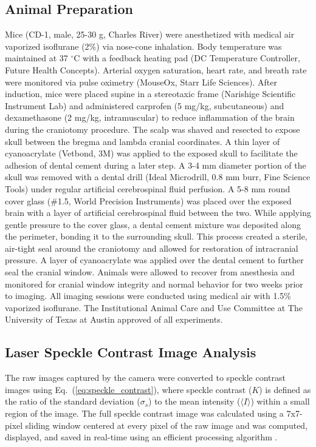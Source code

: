 \documentclass[12pt]{spieman}  %
\begin{document}
\begin{spacing}{2}
\subsection{Animal Preparation}
Mice (CD-1, male, 25-30 g, Charles River) were anesthetized with medical air vaporized isoflurane (2\%) via nose-cone inhalation. Body temperature was maintained at 37 $^\circ$C with a feedback heating pad (DC Temperature Controller, Future Health Concepts). Arterial oxygen saturation, heart rate, and breath rate were monitored via pulse oximetry (MouseOx, Starr Life Sciences). After induction, mice were placed supine in a stereotaxic frame (Narishige Scientific Instrument Lab) and administered carprofen (5 mg/kg, subcutaneous) and dexamethasone (2 mg/kg, intramuscular) to reduce inflammation of the brain during the craniotomy procedure. The scalp was shaved and resected to expose skull between the bregma and lambda cranial coordinates. A thin layer of cyanoacrylate (Vetbond, 3M) was applied to the exposed skull to facilitate the adhesion of dental cement during a later step. A 3-4 mm diameter portion of the skull was removed with a dental drill (Ideal Microdrill, 0.8 mm burr, Fine Science Tools) under regular artificial cerebrospinal fluid perfusion. A 5-8 mm round cover glass (\#1.5, World Precision Instruments) was placed over the exposed brain with a layer of artificial cerebrospinal fluid between the two. While applying gentle pressure to the cover glass, a dental cement mixture was deposited along the perimeter, bonding it to the surrounding skull. This process created a sterile, air-tight seal around the craniotomy and allowed for restoration of intracranial pressure. A layer of cyanoacrylate was applied over the dental cement to further seal the cranial window. Animals were allowed to recover from anesthesia and monitored for cranial window integrity and normal behavior for two weeks prior to imaging. All imaging sessions were conducted using medical air with 1.5\% vaporized isoflurane. The Institutional Animal Care and Use Committee at The University of Texas at Austin approved of all experiments.


\subsection{Laser Speckle Contrast Image Analysis}
The raw images captured by the camera were converted to speckle contrast images using Eq.~(\ref{eq:speckle_contrast}), where speckle contrast ($K$) is defined as the ratio of the standard deviation ($\sigma_{s}$) to the mean intensity ($\langle{I}\rangle$) within a small region of the image. The full speckle contrast image was calculated using a 7x7-pixel sliding window centered at every pixel of the raw image and was computed, displayed, and saved in real-time using an efficient processing algorithm \cite{Tom:2008tg}.


\end{spacing}
\end{document}

